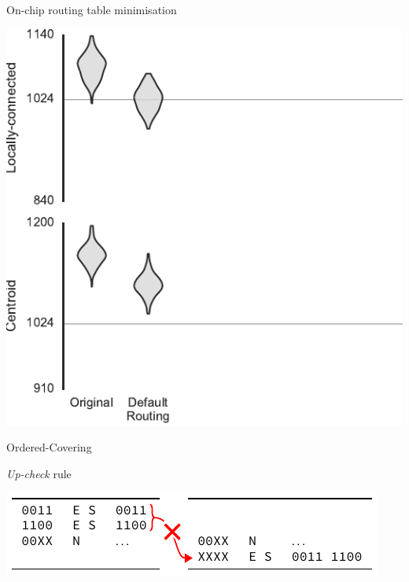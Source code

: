 \documentclass[t]{beamer}
\begin{document}
\begin{frame}{On-chip routing table minimisation}  %
\end{frame}

\begin{frame}[plain]{}
  \begin{center}
    \includegraphics[page=4]{experiments/presentation_plots}
  \end{center}
\end{frame}

\begin{frame}{Ordered-Covering}

\end{frame}

\begin{frame}{\emph{Up-check} rule}
  \begin{center}
    \includegraphics{figures/rule2a_example}
  \end{center}
\end{frame}
\end{document}
